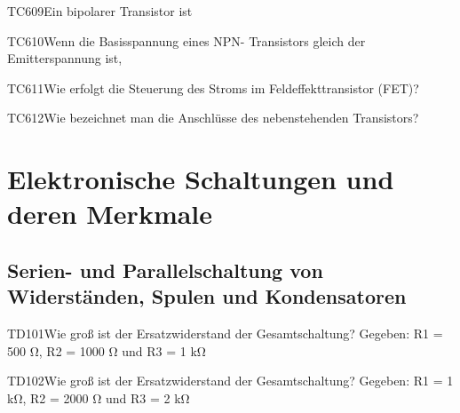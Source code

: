 \begin{question}{TC609}{Ein bipolarer Transistor ist}
\end{question}

\begin{question}{TC610}{Wenn die Basisspannung eines NPN- Transistors gleich der Emitterspannung ist,}
\end{question}

\begin{question}{TC611}{Wie erfolgt die Steuerung des Stroms im Feldeffekttransistor (FET)?}
\end{question}

\begin{question}{TC612}{Wie bezeichnet man die Anschlüsse des nebenstehenden Transistors?}
\end{question}

\section{Elektronische Schaltungen und deren Merkmale}

\subsection{Serien- und Parallelschaltung von Widerständen, Spulen und Kondensatoren}

\begin{question}{TD101}{Wie groß ist der Ersatzwiderstand der Gesamtschaltung? Gegeben: R1 = 500 Ω,  R2 = 1000 Ω und R3 = 1 kΩ}
\end{question}

\begin{question}{TD102}{Wie groß ist der Ersatzwiderstand der Gesamtschaltung? Gegeben: R1 = 1 kΩ,  R2 = 2000 Ω und R3 = 2 kΩ}
\end{question}

